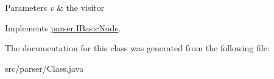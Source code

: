 \begin{DoxyParams}{Parameters}
{\em v} & the visitor \\
\hline
\end{DoxyParams}


Implements \hyperlink{interfaceparser_1_1_i_basic_node_af8790b7076c59e00781ba3d4118757cd}{parser.\+I\+Basic\+Node}.



The documentation for this class was generated from the following file\+:\begin{DoxyCompactItemize}
\item 
src/parser/Class.\+java\end{DoxyCompactItemize}
